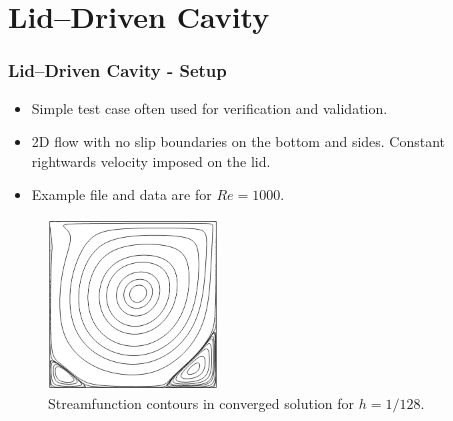 \section{Lid--Driven Cavity}

\begin{frame}
    \frametitle{Lid--Driven Cavity - Setup}
\begin{itemize}
\item Simple test case often used for verification and validation.
\item 2D flow with no slip boundaries on the bottom and sides. Constant rightwards velocity imposed on the lid. 
\item Example file and data are for $Re = 1000$.
\end{itemize}
\begin{figure}
\centering
\includegraphics[width=0.4\textwidth]{./driven_cavity/driven_cavity_streamfunction.png}
\caption{Streamfunction contours in converged solution for $h=1/128$.}
\end{figure}
\end{frame}

